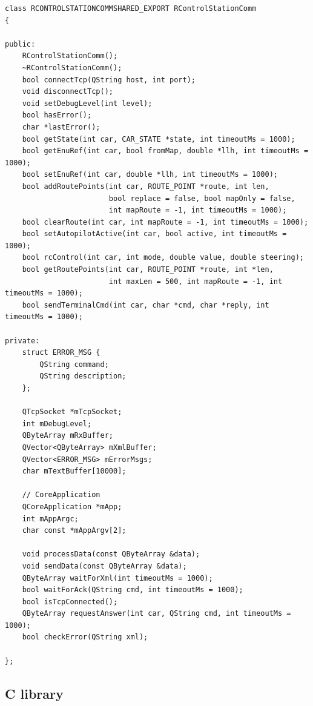 \documentclass[12pt]{article} %
\begin{document}
\begin{Verbatim}
class RCONTROLSTATIONCOMMSHARED_EXPORT RControlStationComm
{

public:
    RControlStationComm();
    ~RControlStationComm();
    bool connectTcp(QString host, int port);
    void disconnectTcp();
    void setDebugLevel(int level);
    bool hasError();
    char *lastError();
    bool getState(int car, CAR_STATE *state, int timeoutMs = 1000);
    bool getEnuRef(int car, bool fromMap, double *llh, int timeoutMs = 1000);
    bool setEnuRef(int car, double *llh, int timeoutMs = 1000);
    bool addRoutePoints(int car, ROUTE_POINT *route, int len,
                        bool replace = false, bool mapOnly = false,
                        int mapRoute = -1, int timeoutMs = 1000);
    bool clearRoute(int car, int mapRoute = -1, int timeoutMs = 1000);
    bool setAutopilotActive(int car, bool active, int timeoutMs = 1000);
    bool rcControl(int car, int mode, double value, double steering);
    bool getRoutePoints(int car, ROUTE_POINT *route, int *len,
                        int maxLen = 500, int mapRoute = -1, int timeoutMs = 1000);
    bool sendTerminalCmd(int car, char *cmd, char *reply, int timeoutMs = 1000);

private:
    struct ERROR_MSG {
        QString command;
        QString description;
    };

    QTcpSocket *mTcpSocket;
    int mDebugLevel;
    QByteArray mRxBuffer;
    QVector<QByteArray> mXmlBuffer;
    QVector<ERROR_MSG> mErrorMsgs;
    char mTextBuffer[10000];

    // CoreApplication
    QCoreApplication *mApp;
    int mAppArgc;
    char const *mAppArgv[2];

    void processData(const QByteArray &data);
    void sendData(const QByteArray &data);
    QByteArray waitForXml(int timeoutMs = 1000);
    bool waitForAck(QString cmd, int timeoutMs = 1000);
    bool isTcpConnected();
    QByteArray requestAnswer(int car, QString cmd, int timeoutMs = 1000);
    bool checkError(QString xml);

};
\end{Verbatim}

\subsection{C library}
\end{document}
